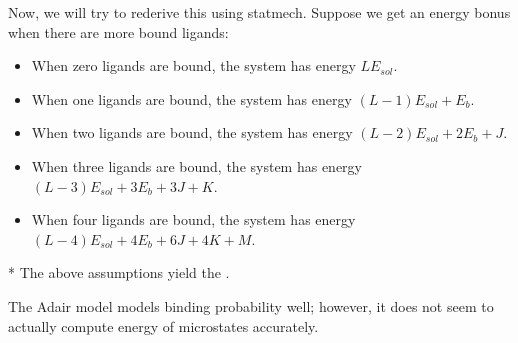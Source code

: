Now, we will try to rederive this using statmech.
Suppose we get an energy bonus when there are more bound ligands:
\begin{itemize}
	\item When zero ligands are bound, the system has energy $LE_{sol}$.
	\item When one ligands are bound, the system has energy $(L-1)E_{sol} + E_b$.
	\item When two ligands are bound, the system has energy $(L-2)E_{sol} + 2E_b + J$.
	\item When three ligands are bound, the system has energy $(L-3)E_{sol} + 3E_b + 3J + K$.
	\item When four ligands are bound, the system has energy $(L-4)E_{sol} + 4E_b + 6J + 4K + M$.
\end{itemize}

\begin{defn}*
	The above assumptions yield the .
\end{defn}

The Adair model models binding probability well; however, it does not seem to actually compute energy of microstates accurately.
